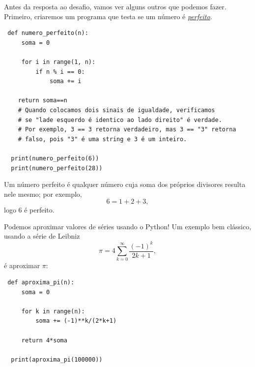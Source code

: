 \documentclass[../numerical_methods.tex]{subfiles}
\begin{document}
Antes da resposta ao desafio, vamos ver alguns outros que podemos fazer. Primeiro, criaremos um programa que testa se um número é \hyperlink{perfect_number}{\textit{perfeito}}.
\begin{listing}[H]
	\caption{Detectar se número é perfeito}
	\begin{verbatim}
 def numero_perfeito(n):
     soma = 0 

     for i in range(1, n):
         if n % i == 0:
             soma += i 

    return soma==n 
    # Quando colocamos dois sinais de igualdade, verificamos 
    # se "lade esquerdo é identico ao lado direito" é verdade. 
    # Por exemplo, 3 == 3 retorna verdadeiro, mas 3 == "3" retorna 
    # falso, pois "3" é uma string e 3 é um inteiro.

  print(numero_perfeito(6))
  print(numero_perfeito(28))
 \end{verbatim}
\end{listing}

\begin{tcolorbox}[
		skin=enhanced,
		title=Lembrete!,
		after title={\hfill Número Perfeito},
		fonttitle=\bfseries,
		sharp corners=downhill,
		colframe=black,
		colbacktitle=yellow!75!white,
		colback=yellow!30,
		colbacklower=black,
		coltitle=black,
		drop large lifted shadow
	]
	Um \hypertarget{perfect_number}{número perfeito} é qualquer número cuja soma dos próprios divisores resulta nele mesmo; por exemplo,
	\[
		6 = 1+2+3,
	\]
	logo 6 é perfeito.
\end{tcolorbox}

Podemos aproximar valores de séries usando o Python! Um exemplo bem clássico, usando a série de Leibniz
\[
	\pi = 4 \sum\limits_{k=0}^{\infty}\frac{(-1)^{k}}{2k+1},
\]
é aproximar \( \pi \):
\begin{listing}[H]
	\caption{Aproximação de \(\pi \)}
	\begin{verbatim}
 def aproxima_pi(n):
     soma = 0 

     for k in range(n):
         soma += (-1)**k/(2*k+1)

     return 4*soma

  print(aproxima_pi(100000))
 \end{verbatim}
\end{listing}
\end{document}
